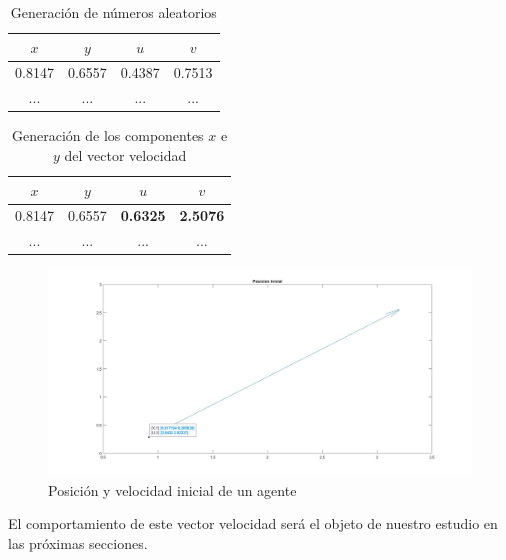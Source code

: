\begin{table}[!h]
    \begin{center}
        \begin{tabular}{| c | c | c | c |}
            \hline
            $x$ & $y$ & $u$ & $v$ \\
            \hline
            0.8147 & 0.6557 & 0.4387 & 0.7513 \\
            \hline
            ... & ... & ... & ... \\
            \hline
        \end{tabular}
        \caption{Generación de números aleatorios}
        \label{tab:XVi1}
    \end{center}
\end{table}
\begin{table}[!h]
    \begin{center}
        \begin{tabular}{| c | c | c | c |}
            \hline
            $x$ & $y$ & $u$ & $v$ \\
            \hline
            0.8147 & 0.6557 & \textbf{0.6325} & \textbf{2.5076} \\
            \hline
            ... & ... & ... & ... \\
            \hline
        \end{tabular}
        \caption{Generación de los componentes $x$ e $y$ del vector velocidad}
        \label{tab:XVi2}
    \end{center}
\end{table}

\begin{figure}[!h]
  \centering
    \includegraphics[scale=0.2]{fig/cap04/unelemento.jpg}
  \caption{Posición y velocidad inicial de un agente}
  \label{fig:posInicial}
\end{figure}


El comportamiento de este vector velocidad será el objeto de nuestro estudio en las próximas secciones. 
